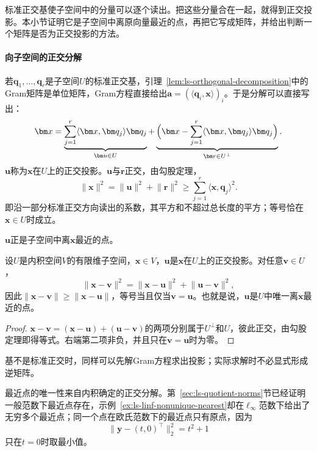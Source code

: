 标准正交基使子空间中的分量可以逐个读出。把这些分量合在一起，就得到正交投影。本小节证明它是子空间中离原向量最近的点，再把它写成矩阵，并给出判断一个矩阵是否为正交投影的方法。

\paragraph{向子空间的正交分解}
若$\bm q_1,\ldots,\bm q_r$是子空间$U$的标准正交基，引理~\ref{lem:ls-orthogonal-decomposition}中的Gram矩阵是单位矩阵，Gram方程直接给出$\bm a=(\langle\bm q_i,\bm x\rangle)_i$。于是分解可以直接写出：
\begin{equation}
 \bm x=\underbrace{\sum_{j=1}^r\langle\bm x,\bm q_j\rangle\bm q_j}_{\bm u\in U}+\underbrace{\Bigl(\bm x-\sum_{j=1}^r\langle\bm x,\bm q_j\rangle\bm q_j\Bigr)}_{\bm r\in U^\perp}.
 \label{eq:ls-orthonormal-projection}
\end{equation}
$\bm u$称为$\bm x$在$U$上的正交投影。$\bm u$与$\bm r$正交，由勾股定理，
\[
 \lVert\bm x\rVert^2=\lVert\bm u\rVert^2+\lVert\bm r\rVert^2\geq\sum_{j=1}^r\langle\bm x,\bm q_j\rangle^2.
\]
即沿一部分标准正交方向读出的系数，其平方和不超过总长度的平方；等号恰在$\bm x\in U$时成立。

$\bm u$正是子空间中离$\bm x$最近的点。
\begin{theorem}[正交投影是最近点]
\label{thm:ls-orthogonal-projection-nearest}
设$U$是内积空间$V$的有限维子空间，$\bm x\in V$，$\bm u$是$\bm x$在$U$上的正交投影。对任意$\bm v\in U$，
\[
 \lVert\bm x-\bm v\rVert^2=\lVert\bm x-\bm u\rVert^2+\lVert\bm u-\bm v\rVert^2,
\]
因此$\lVert\bm x-\bm v\rVert\geq\lVert\bm x-\bm u\rVert$，等号当且仅当$\bm v=\bm u$。也就是说，$\bm u$是$U$中唯一离$\bm x$最近的点。
\end{theorem}
\begin{proof}
$\bm x-\bm v=(\bm x-\bm u)+(\bm u-\bm v)$的两项分别属于$U^\perp$和$U$，彼此正交，由勾股定理即得等式。右端第二项非负，并且只在$\bm v=\bm u$时为零。
\end{proof}
基不是标准正交时，同样可以先解Gram方程求出投影；实际求解时不必显式形成逆矩阵。

最近点的唯一性来自内积确定的正交分解。第~\ref{sec:ls-quotient-norms}节已经证明一般范数下最近点存在，示例~\ref{ex:ls-linf-nonunique-nearest}却在$\ell_\infty$范数下给出了无穷多个最近点；同一个点在欧氏范数下的最近点只有原点，因为
\[
 \lVert\bm y-(t,0)^\top\rVert_2^2=t^2+1
\]
只在$t=0$时取最小值。

